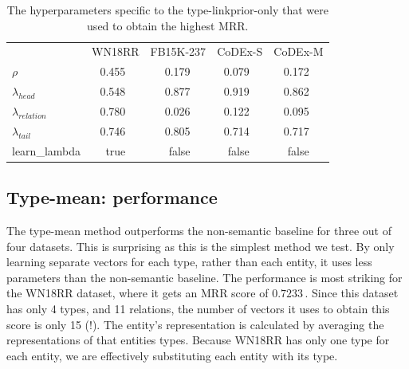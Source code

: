\begin{table}[ht]
    \def\fn{\hspace{2pt}} %
    \setlength{\tabcolsep}{5pt}
    \centering
    \begin{tabular}{lr@{\fn}lr@{\fn}lr@{\fn}lr@{\fn}l}
        \toprule
                &\multicolumn{2}{c}{WN18RR}
                            &\multicolumn{2}{c}{FB15K-237}   
                                           & \multicolumn{2}{c}{CoDEx-S}   
                                                                & \multicolumn{2}{c}{CoDEx-M} \\
        \cmidrule{1-9}
        $\rho$                  & 0.455 && 0.179 && 0.079 && 0.172 \\
        \cmidrule{1-9}
        $\lambda_{head}$        & 0.548 && 0.877 && 0.919 && 0.862 \\
        $\lambda_{relation}$    & 0.780 && 0.026 && 0.122 && 0.095 \\
        $\lambda_{tail}$        & 0.746 && 0.805 && 0.714 && 0.717 \\
        \cmidrule{1-9}
        learn\_lambda           & true  && false && false && false \\
        \bottomrule
    \end{tabular} %
    \caption{The hyperparameters specific to the type-linkprior-only that were used to obtain the highest MRR.} 
    \label{tab:linkprior-only-hparams}
\end{table}


\subsection{Type-mean: performance}\label{sec:analysis:type_mean_performance}
The type-mean method outperforms the non-semantic baseline for three out of four datasets. 
This is surprising as this is the simplest method we test. By only learning separate vectors for each type, rather than each entity, it uses less parameters than the non-semantic baseline. 
The performance is most striking for the WN18RR dataset, where it gets an MRR score of $0.7233$\,. 
Since this dataset has only 4 types, and 11 relations, the number of vectors it uses to obtain this score is only 15 (!).
The entity's representation is calculated by averaging the representations of that entities types. Because WN18RR has only one type for each entity, we are effectively substituting each entity with its type. 

